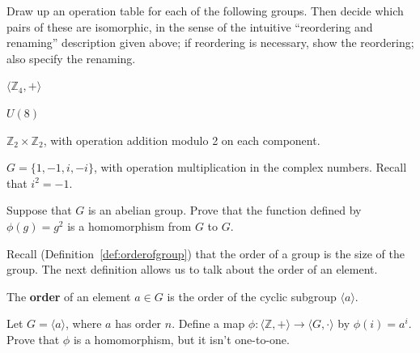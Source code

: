 \begin{problem}
Draw up an operation table for each of the following groups. Then decide which pairs of these are isomorphic, in the sense of the intuitive ``reordering and renaming'' description given above; if reordering is necessary, show the reordering; also specify the renaming.
\begin{problemparts}
  \item \( \langle \mathbb{Z}_4, + \rangle  \)
  \item \( U(8) \)
  \item \( \mathbb{Z}_2 \times \mathbb{Z}_2 \), with operation addition modulo 2 on each component.
  \item \( G = \{1, -1, i, -i \} \), with operation multiplication in the complex numbers. Recall that \(i^2 = -1\).
\end{problemparts}
\end{problem}

\begin{problem}
Suppose that \(G\) is an abelian group. Prove that the function defined by \(\phi(g) = g^2\) is a homomorphism from \(G\) to \(G\).
\end{problem}

Recall (Definition~\ref{def:orderofgroup}) that the order of a group is the size of the group. The next definition allows us to talk about the order of an element.

\begin{definition}
    The \textbf{order} of an element $a \in G$ is the order of the cyclic subgroup $\langle a \rangle$.
\end{definition}

\begin{problem}\label{prob:finitecyclic}
Let \(G = \langle a \rangle\), where \(a\) has order \(n\). Define a map \(\phi : \langle \mathbb{Z} , + \rangle \longrightarrow \langle G, \cdot \rangle \) by \(\phi(i) = a^i\). Prove that \(\phi\) is a homomorphism, but it isn't one-to-one.
\begin{annotation}
\end{annotation}
\end{problem}

